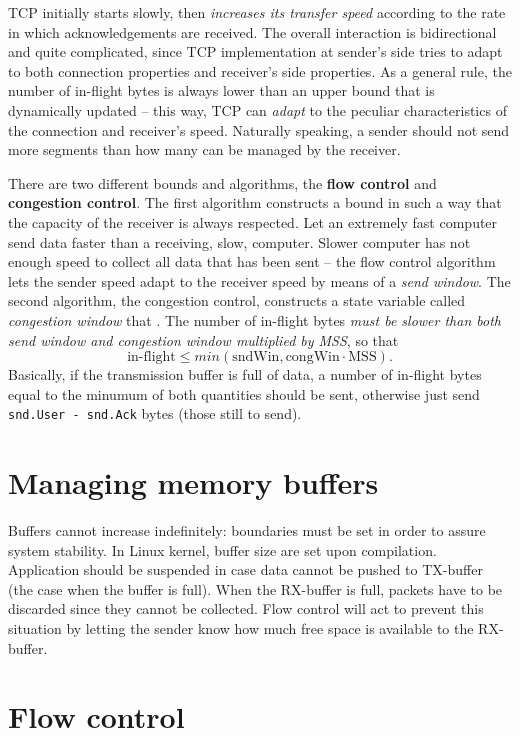 \documentclass[a4paper, 11pt]{report}
\begin{document}
TCP initially starts slowly, then \emph{increases its transfer speed} according
to the rate in which acknowledgements are received. The overall interaction is
bidirectional and quite complicated, since TCP implementation at sender's side
tries to adapt to both connection properties and receiver's side properties.
As a general rule, the number of in-flight bytes is always lower than an upper
bound that is dynamically updated \--- this way, TCP can \emph{adapt} to the
peculiar characteristics of the connection and receiver's speed. Naturally
speaking, a sender should not send more segments than how many can be managed
by the receiver.

There are two different bounds and algorithms, the \textbf{flow control} and
\textbf{congestion control}. The first algorithm constructs a bound in such a
way that the capacity of the receiver is always respected. Let an extremely
fast computer send data faster than a receiving, slow, computer. Slower
computer has not enough speed to collect all data that has been sent \--- the
flow control algorithm lets the sender speed adapt to the receiver speed by
means of a \emph{send window}. The second algorithm, the congestion control,
constructs a state variable called \emph{congestion window} that . The number
of in-flight bytes \emph{must be slower than both send window and congestion
window multiplied by MSS}, so that $$\mbox{in-flight} \leq min(\mbox{sndWin},
\mbox{congWin} \cdot \mbox{MSS}).$$ Basically, if the transmission buffer is full of data,
a number of in-flight bytes equal to the minumum of both quantities should be
sent, otherwise just send \texttt{snd.User - snd.Ack} bytes (those still to
send).

\section{Managing memory buffers}

Buffers cannot increase indefinitely: boundaries must be set in order to assure
system stability. In Linux kernel, buffer size are set upon compilation.
Application should be suspended in case data cannot be pushed to TX-buffer (the
case when the buffer is full). When the RX-buffer is full, packets have to be
discarded since they cannot be collected. Flow control will act to prevent this
situation by letting the sender know how much free space is available to the
RX-buffer.

\section{Flow control}
\end{document}
